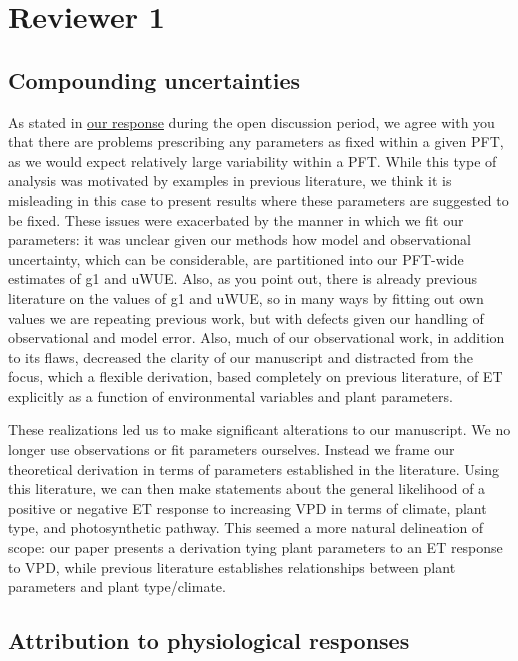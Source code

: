 \documentclass[12pt]{article}
\begin{document}
\section{Reviewer 1}

\subsection{Compounding uncertainties}
\label{pft}
As stated in
\href{https://editor.copernicus.org/index.php/hess-2018-553-AC1.pdf}{our
  response} during the open discussion period, we agree
with you that there are problems prescribing any parameters as fixed
within a given PFT, as we would expect relatively large variability
within a PFT. While this type of analysis was motivated by examples in
previous literature, we think it is misleading in this case to present
results where these parameters are suggested to be fixed. These issues
were exacerbated by the manner in which we fit our parameters: it was
unclear given our methods how model and observational uncertainty,
which can be considerable, are partitioned into our PFT-wide estimates
of g1 and uWUE. Also, as you point out, there is already previous
literature on the values of g1 and uWUE, so in many ways by fitting
out own values we are repeating previous work, but with defects given
our handling of observational and model error. Also, much of our
observational work, in addition to its flaws, decreased the clarity of
our manuscript and distracted from the focus, which a flexible
derivation, based completely on previous literature, of ET explicitly
as a function of environmental variables and plant parameters.

These realizations led us to make significant alterations to our
manuscript. We no longer use observations or fit parameters
ourselves. Instead we frame our theoretical derivation in terms of
parameters established in the literature. Using this literature, we
can then make statements about the general likelihood of a positive or
negative ET response to increasing VPD in terms of climate, plant
type, and photosynthetic pathway. This seemed a more natural
delineation of scope: our paper presents a derivation tying plant
parameters to an ET response to VPD, while previous literature
establishes relationships between plant parameters and plant
type/climate.

\subsection{Attribution to physiological responses}
\end{document}
